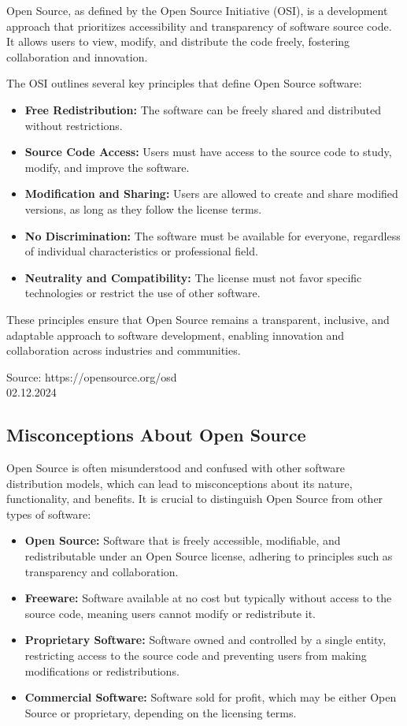 Open Source, as defined by the Open Source Initiative (OSI), is a development approach that prioritizes accessibility and transparency of software source code. It allows users to view, modify, and distribute the code freely, fostering collaboration and innovation. 

The OSI outlines several key principles that define Open Source software:

\begin{itemize}
    \item \textbf{Free Redistribution:} The software can be freely shared and distributed without restrictions.
    \item \textbf{Source Code Access:} Users must have access to the source code to study, modify, and improve the software.
    \item \textbf{Modification and Sharing:} Users are allowed to create and share modified versions, as long as they follow the license terms.
    \item \textbf{No Discrimination:} The software must be available for everyone, regardless of individual characteristics or professional field.
    \item \textbf{Neutrality and Compatibility:} The license must not favor specific technologies or restrict the use of other software.
\end{itemize}

These principles ensure that Open Source remains a transparent, inclusive, and adaptable approach to software development, enabling innovation and collaboration across industries and communities.

Source: https://opensource.org/osd \\ 02.12.2024

\subsection{Misconceptions About Open Source}

Open Source is often misunderstood and confused with other software distribution models, which can lead to misconceptions about its nature, functionality, and benefits. 
It is crucial to distinguish Open Source from other types of software:

\begin{itemize}
    \item \textbf{Open Source:} Software that is freely accessible, modifiable, and redistributable under an Open Source license, adhering to principles such as transparency and collaboration.
    \item \textbf{Freeware:} Software available at no cost but typically without access to the source code, meaning users cannot modify or redistribute it.
    \item \textbf{Proprietary Software:} Software owned and controlled by a single entity, restricting access to the source code and preventing users from making modifications or redistributions.
    \item \textbf{Commercial Software:} Software sold for profit, which may be either Open Source or proprietary, depending on the licensing terms.
\end{itemize}

